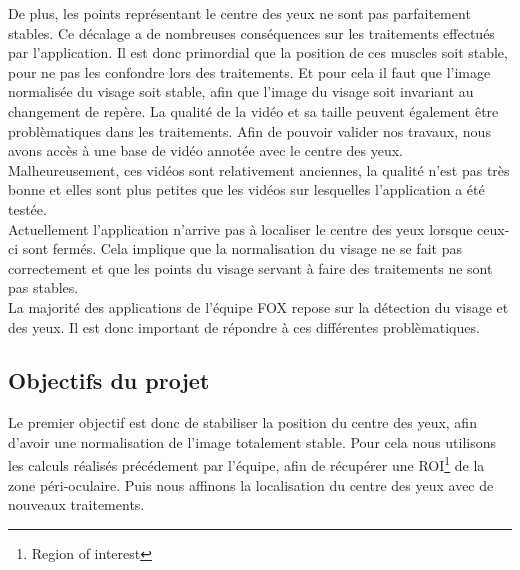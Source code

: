 De plus, les points représentant le centre des yeux ne sont pas parfaitement stables. Ce décalage a de 
nombreuses conséquences sur les traitements effectués par l'application. 
Il est donc primordial que la position de ces muscles soit stable, pour ne pas les confondre
lors des traitements. Et pour cela il faut que l'image normalisée du visage soit stable, afin que l'image
du visage soit invariant au changement de repère.
La qualité de la vidéo et sa taille peuvent également être problèmatiques dans les traitements. Afin de
pouvoir valider nos travaux, nous avons accès à une base de vidéo annotée avec le centre des yeux. 
Malheureusement, ces vidéos sont relativement anciennes, la qualité n'est pas 
très bonne et elles sont plus petites que les vidéos sur lesquelles l'application a été testée.\\

Actuellement l'application n'arrive pas à localiser le centre des yeux lorsque ceux-ci sont fermés. 
Cela implique que la normalisation du visage ne se fait pas correctement et que les points du
visage servant à faire des traitements ne sont pas stables.\\

La majorité des applications de l'équipe FOX repose sur la détection du visage et des yeux. Il est donc 
important de répondre à ces différentes problèmatiques.

\subsection{Objectifs du projet}

Le premier objectif est donc de stabiliser la position du centre des yeux, afin d'avoir une normalisation de l'image
totalement stable. Pour cela nous utilisons les calculs réalisés précédement par l'équipe, 
afin de récupérer une ROI\footnote{Region of interest} de la zone péri-oculaire. Puis
nous affinons la localisation du centre des yeux avec de nouveaux traitements.\\

